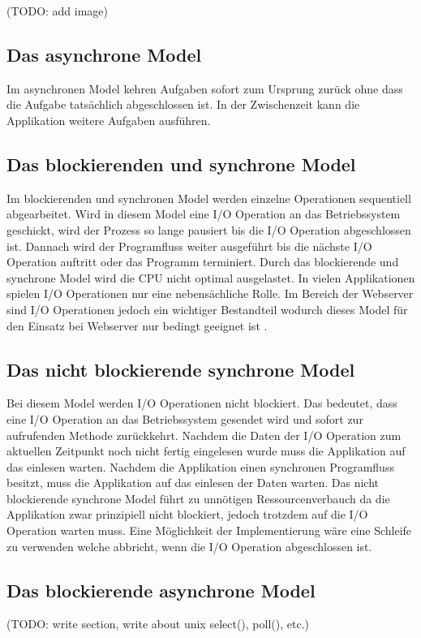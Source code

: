 (TODO: add image)

\subsection{Das asynchrone Model}

Im asynchronen Model kehren Aufgaben sofort zum Ursprung zurück ohne dass die Aufgabe tatsächlich abgeschlossen ist. In der Zwischenzeit kann die Applikation weitere Aufgaben ausführen. 

\subsection{Das blockierenden und synchrone Model}
Im blockierenden und synchronen Model werden einzelne Operationen sequentiell abgearbeitet. Wird in diesem Model eine I/O Operation an das Betriebssystem geschickt, wird der Prozess so lange pausiert bis die I/O Operation abgeschlossen ist. Dannach wird der Programfluss weiter ausgeführt bis die nächste I/O Operation auftritt oder das Programm terminiert. Durch das blockierende und synchrone Model wird die CPU nicht optimal ausgelastet. In vielen Applikationen spielen I/O Operationen nur eine nebensächliche Rolle. Im Bereich der Webserver sind I/O Operationen jedoch ein wichtiger Bestandteil wodurch dieses Model für den Einsatz bei Webserver nur bedingt geeignet ist \cite[p. 48]{Erb2012}. 

\subsection{Das nicht blockierende synchrone Model}
Bei diesem Model werden I/O Operationen nicht blockiert. Das bedeutet, dass eine I/O Operation an das Betriebssystem gesendet wird und sofort zur aufrufenden Methode zurückkehrt. Nachdem die Daten der I/O Operation zum aktuellen Zeitpunkt noch nicht fertig eingelesen wurde muss die Applikation auf das einlesen warten. Nachdem die Applikation einen synchronen Programfluss besitzt, muss die Applikation auf das einlesen der Daten warten. Das nicht blockierende synchrone Model führt zu unnötigen Ressourcenverbauch da die Applikation zwar prinzipiell nicht blockiert, jedoch trotzdem auf die I/O Operation warten muss. Eine Möglichkeit der Implementierung wäre eine Schleife zu verwenden welche abbricht, wenn die I/O Operation abgeschlossen ist.\cite[p. 48]{Erb2012}

\subsection{Das blockierende asynchrone Model}
(TODO: write section, write about unix select(), poll(), etc.) 


